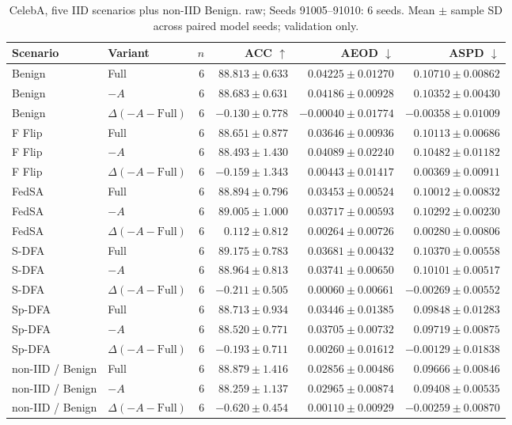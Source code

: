 \begin{table}[t]
\centering
\small
\caption{CelebA, five IID scenarios plus non-IID Benign. raw; Seeds 91005–91010: 6 seeds. Mean $\pm$ sample SD across paired model seeds; validation only.}
\begin{tabular}{llrrrr}
\toprule
Scenario & Variant & $n$ & ACC $\uparrow$ & AEOD $\downarrow$ & ASPD $\downarrow$ \\
\midrule
Benign & Full & 6 & $88.813 \pm 0.633$ & $0.04225 \pm 0.01270$ & $0.10710 \pm 0.00862$ \\
Benign & $-A$ & 6 & $88.683 \pm 0.631$ & $0.04186 \pm 0.00928$ & $0.10352 \pm 0.00430$ \\
Benign & $\Delta(-A-\mathrm{Full})$ & 6 & $-0.130 \pm 0.778$ & $-0.00040 \pm 0.01774$ & $-0.00358 \pm 0.01009$ \\
F Flip & Full & 6 & $88.651 \pm 0.877$ & $0.03646 \pm 0.00936$ & $0.10113 \pm 0.00686$ \\
F Flip & $-A$ & 6 & $88.493 \pm 1.430$ & $0.04089 \pm 0.02240$ & $0.10482 \pm 0.01182$ \\
F Flip & $\Delta(-A-\mathrm{Full})$ & 6 & $-0.159 \pm 1.343$ & $0.00443 \pm 0.01417$ & $0.00369 \pm 0.00911$ \\
FedSA & Full & 6 & $88.894 \pm 0.796$ & $0.03453 \pm 0.00524$ & $0.10012 \pm 0.00832$ \\
FedSA & $-A$ & 6 & $89.005 \pm 1.000$ & $0.03717 \pm 0.00593$ & $0.10292 \pm 0.00230$ \\
FedSA & $\Delta(-A-\mathrm{Full})$ & 6 & $0.112 \pm 0.812$ & $0.00264 \pm 0.00726$ & $0.00280 \pm 0.00806$ \\
S-DFA & Full & 6 & $89.175 \pm 0.783$ & $0.03681 \pm 0.00432$ & $0.10370 \pm 0.00558$ \\
S-DFA & $-A$ & 6 & $88.964 \pm 0.813$ & $0.03741 \pm 0.00650$ & $0.10101 \pm 0.00517$ \\
S-DFA & $\Delta(-A-\mathrm{Full})$ & 6 & $-0.211 \pm 0.505$ & $0.00060 \pm 0.00661$ & $-0.00269 \pm 0.00552$ \\
Sp-DFA & Full & 6 & $88.713 \pm 0.934$ & $0.03446 \pm 0.01385$ & $0.09848 \pm 0.01283$ \\
Sp-DFA & $-A$ & 6 & $88.520 \pm 0.771$ & $0.03705 \pm 0.00732$ & $0.09719 \pm 0.00875$ \\
Sp-DFA & $\Delta(-A-\mathrm{Full})$ & 6 & $-0.193 \pm 0.711$ & $0.00260 \pm 0.01612$ & $-0.00129 \pm 0.01838$ \\
non-IID / Benign & Full & 6 & $88.879 \pm 1.416$ & $0.02856 \pm 0.00486$ & $0.09666 \pm 0.00846$ \\
non-IID / Benign & $-A$ & 6 & $88.259 \pm 1.137$ & $0.02965 \pm 0.00874$ & $0.09408 \pm 0.00535$ \\
non-IID / Benign & $\Delta(-A-\mathrm{Full})$ & 6 & $-0.620 \pm 0.454$ & $0.00110 \pm 0.00929$ & $-0.00259 \pm 0.00870$ \\
\bottomrule
\end{tabular}
\end{table}

